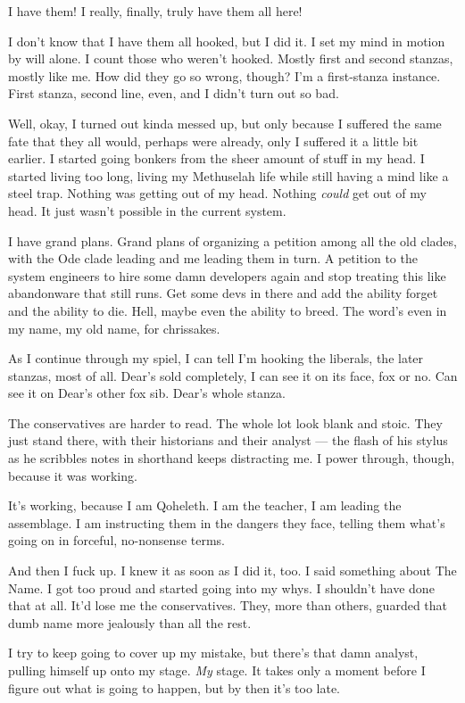I have them! I really, finally, truly have them all here!

I don't know that I have them all hooked, but I did it. I set my mind in motion by will alone. I count those who weren't hooked. Mostly first and second stanzas, mostly like me. How did they go so wrong, though? I'm a first-stanza instance. First stanza, second line, even, and I didn't turn out so bad.

Well, okay, I turned out kinda messed up, but only because I suffered the same fate that they all would, perhaps were already, only I suffered it a little bit earlier. I started going bonkers from the sheer amount of stuff in my head. I started living too long, living my Methuselah life while still having a mind like a steel trap. Nothing was getting out of my head. Nothing \emph{could} get out of my head. It just wasn't possible in the current system.

I have grand plans. Grand plans of organizing a petition among all the old clades, with the Ode clade leading and me leading them in turn. A petition to the system engineers to hire some damn developers again and stop treating this like abandonware that still runs. Get some devs in there and add the ability forget and the ability to die. Hell, maybe even the ability to breed. The word's even in my name, my old name, for chrissakes.

As I continue through my spiel, I can tell I'm hooking the liberals, the later stanzas, most of all. Dear's sold completely, I can see it on its face, fox or no. Can see it on Dear's other fox sib. Dear's whole stanza.

The conservatives are harder to read. The whole lot look blank and stoic. They just stand there, with their historians and their analyst --- the flash of his stylus as he scribbles notes in shorthand keeps distracting me. I power through, though, because it was working.

It's working, because I am Qoheleth. I am the teacher, I am leading the assemblage. I am instructing them in the dangers they face, telling them what's going on in forceful, no-nonsense terms.

And then I fuck up. I knew it as soon as I did it, too. I said something about The Name. I got too proud and started going into my whys. I shouldn't have done that at all. It'd lose me the conservatives. They, more than others, guarded that dumb name more jealously than all the rest.

I try to keep going to cover up my mistake, but there's that damn analyst, pulling himself up onto my stage. \emph{My} stage. It takes only a moment before I figure out what is going to happen, but by then it's too late.

